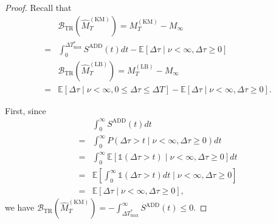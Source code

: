\documentclass{article}
\theoremstyle{plain}
\theoremstyle{definition}
\theoremstyle{remark}
\def\nn{\nonumber \\ }
\def\mbe{\mathbb{E}}
\def\mbone{\mathds{1}}
\begin{document}
\begin{proof}
    Recall that 
    \begin{align}
        &\mathcal{B}_\mathrm{TR}(\hat{M}_T^\mathrm{(KM)}) =  M_T^{\mathrm{(KM)}} - M_\infty \nn
        =& \int_0^{\Delta T_\mathrm{max}^*} S^\mathrm{ADD}(t) dt
        - \mbe[\Delta\tau \mid \nu < \infty, \Delta \tau \geq 0] \\
        &\mathcal{B}_\mathrm{TR}(\hat{M}_T^\mathrm{(LB)}) =  M_T^{\mathrm{(LB)}} - M_\infty \nn
        =& \mbe[\Delta\tau \mid \nu < \infty,0 \leq \Delta \tau \leq \Delta T]
        - \mbe[\Delta\tau \mid \nu < \infty,  \Delta \tau \geq 0].
    \end{align}
    
    First, since 
    \begin{align}
        &\int_0^\infty S^\mathrm{ADD}(t)  dt \\
        =& \int_0^\infty P(\Delta \tau > t \mid \nu < \infty, \Delta \tau \geq 0) dt \\
        =& \int_0^\infty  \mbe[\mbone(\Delta \tau > t) \mid \nu < \infty, \Delta \tau \geq 0] dt \\
        =& \mbe[\int_0^\infty \mbone(\Delta\tau > t) dt \mid \nu < \infty, \Delta \tau \geq 0] \\
        =& \mbe[\Delta \tau \mid \nu < \infty, \Delta \tau \geq 0]  ,
    \end{align}
    we have 
    $\mathcal{B}_\mathrm{TR}(\hat{M}_T^\mathrm{(KM)}) = - \int_{\Delta T_\mathrm{max}^*}^\infty S^\mathrm{ADD}(t) \leq 0$.    


\end{proof}
\end{document}
